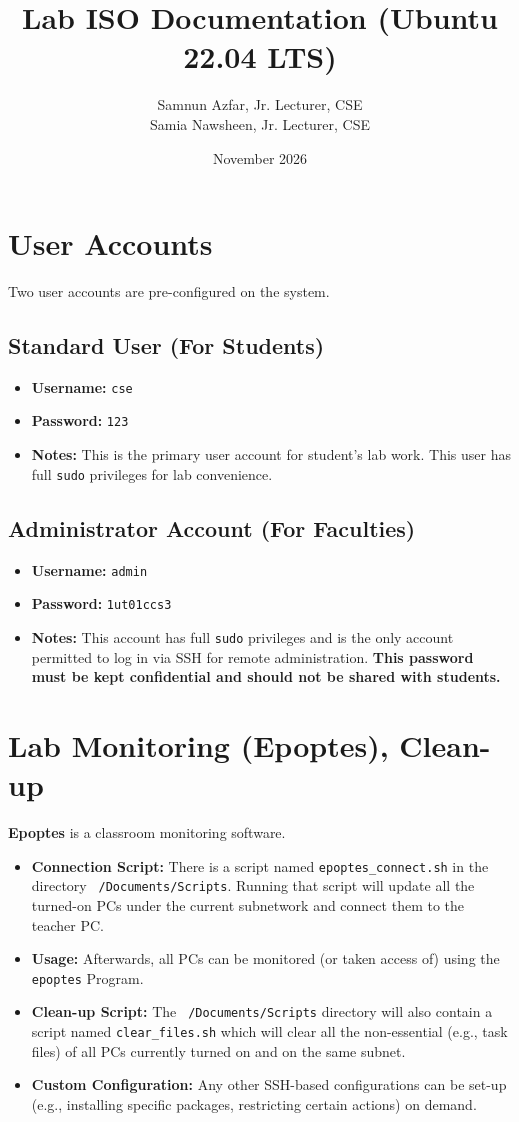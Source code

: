 \documentclass[12pt]{article}
\title{\textbf{Lab ISO Documentation (Ubuntu 22.04 LTS)}}
\author{Samnun Azfar, Jr. Lecturer, CSE \\ Samia Nawsheen, Jr. Lecturer, CSE}
\date{November 2026}
\begin{document}
\maketitle

\section{User Accounts}
Two user accounts are pre-configured on the system.

\subsection*{Standard User (For Students)}
\begin{itemize}
    \item \textbf{Username:} \texttt{cse}
    \item \textbf{Password:} \texttt{123}
    \item \textbf{Notes:} This is the primary user account for student's lab work. This user has full \texttt{sudo} privileges for lab convenience.
\end{itemize}

\subsection*{Administrator Account (For Faculties)}
\begin{itemize}
    \item \textbf{Username:} \texttt{admin}
    \item \textbf{Password:} \texttt{1ut01ccs3}
    \item \textbf{Notes:} This account has full \texttt{sudo} privileges and is the only account permitted to log in via SSH for remote administration. \textbf{This password must be kept confidential and should not be shared with students.}
\end{itemize}

\section{Lab Monitoring (Epoptes), Clean-up}
\textbf{Epoptes} is a classroom monitoring software.
\begin{itemize}
    \item \textbf{Connection Script:} There is a script named \texttt{epoptes\_connect.sh} in the directory \texttt{\string~/Documents/Scripts}. Running that script will update all the turned-on PCs under the current subnetwork and connect them to the teacher PC.
    \item \textbf{Usage:} Afterwards, all PCs can be monitored (or taken access of) using the \texttt{epoptes} Program. 
    \item \textbf{Clean-up Script:} The \texttt{\string~/Documents/Scripts} directory will also contain a script named \texttt{clear\_files.sh} which will clear all the non-essential (e.g., task files) of all PCs currently turned on and on the same subnet.
    \item \textbf{Custom Configuration:} Any other SSH-based configurations can be set-up (e.g., installing specific packages, restricting certain actions) on demand.
\end{itemize}
\end{document}
